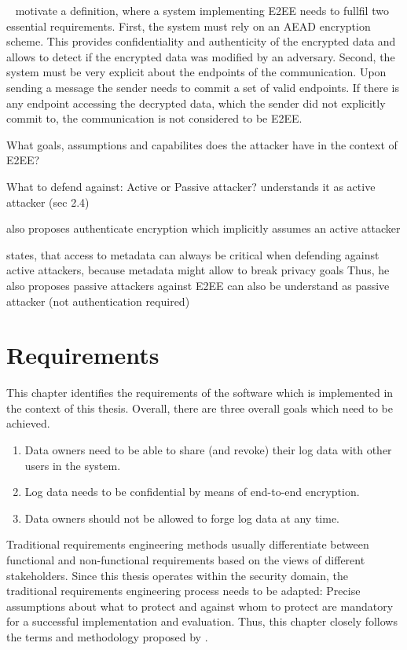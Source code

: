 \documentclass[../main.tex]{subfiles}
\begin{document}
\citeauthor{Hale2022}~\cite{Hale2022} motivate a definition, where a system implementing E2EE needs to fullfil two essential requirements.
First, the system must rely on an AEAD encryption scheme. 
This provides confidentiality and authenticity of the encrypted data and allows to detect if the encrypted data was modified by an adversary.
Second, the system must be very explicit about the endpoints of the communication. 
Upon sending a message the sender needs to commit a set of valid endpoints.
If there is any endpoint accessing the decrypted data, which the sender did not explicitly commit to, the communication is not considered to be E2EE.


What goals, assumptions and capabilites does the attacker have in the context of E2EE?


What to defend against: Active or Passive attacker?
\cite{Mallory2022} understands it as active attacker (sec 2.4)


\cite{Hale2022} also proposes authenticate encryption which implicitly assumes an active attacker


\cite{Nabeel2017} states, that access to metadata can always be critical when defending against active attackers, because metadata might allow to break privacy goals
Thus, he also proposes passive attackers against E2EE can also be understand as passive attacker (not authentication required)





\chapter{Requirements}

This chapter identifies the requirements of the software which is implemented in the context of this thesis.
Overall, there are three overall goals which need to be achieved. 

\begin{enumerate}[label=\Roman*.]
    \item Data owners need to be able to share (and revoke) their log data with other users in the system.
	\item Log data needs to be confidential by means of end-to-end encryption.
    \item Data owners should not be allowed to forge log data at any time.
\end{enumerate}


Traditional requirements engineering methods usually differentiate between functional and non-functional requirements based on the views of different stakeholders.
Since this thesis operates within the security domain, the traditional requirements engineering process needs to be adapted: 
Precise assumptions about what to protect and against whom to protect are mandatory for a successful implementation and evaluation.
Thus, this chapter closely follows the terms and methodology proposed by \citeauthor{Fabian2010} \cite{Fabian2010}.
\end{document}
